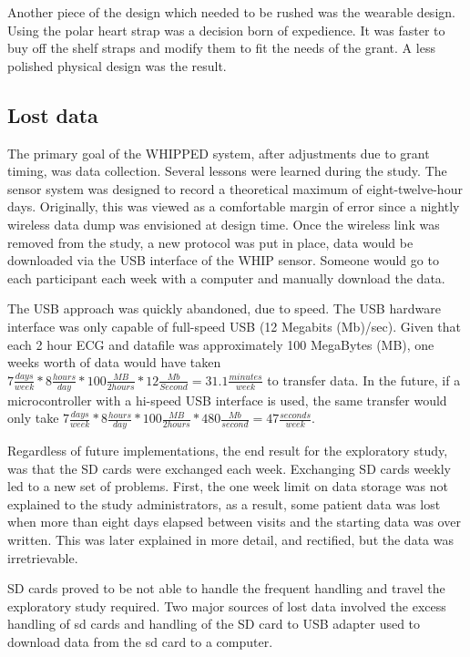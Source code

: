 Another piece of the design which needed to be rushed was the wearable design. Using the polar heart strap was a decision born of expedience. It was faster to buy off the shelf straps and modify them to fit the needs of the grant. A less polished physical design was the result.

\subsection {Lost data}
The primary goal of the WHIPPED system, after adjustments due to grant timing, was data collection. Several lessons were learned during the study. The sensor system was designed to record a theoretical maximum of eight-twelve-hour days. Originally, this was viewed as a comfortable margin of error since a nightly wireless data dump was envisioned at design time. Once the wireless link was removed from the study, a new protocol was put in place, data would be downloaded via the USB interface of the WHIP sensor. Someone would go to each participant each week with a computer and manually download the data.

The USB approach was quickly abandoned, due to speed. The USB hardware interface was only capable of full-speed USB (12 Megabits (Mb)/sec). Given that each 2 hour ECG and  datafile was approximately 100 MegaBytes (MB), one weeks worth of data would have taken $ 7 \frac{days}{week} * 8 \frac{hours}{day} * 100 \frac{MB}{2 hours} * 12 \frac{Mb}{Second} = 31.1 \frac{minutes}{week}$ to transfer data. In the future, if a microcontroller with a hi-speed USB interface is used, the same transfer would only take $ 7 \frac{days}{week} * 8 \frac{hours}{day} * 100 \frac{MB}{2 hours} * 480 \frac{Mb}{second} = 47 \frac{seconds}{week}$.  

Regardless of future implementations, the end result for the exploratory study, was that the SD cards were exchanged each week. 
Exchanging SD cards weekly led to a new set of problems. First, the one week limit on data storage was not explained to the study administrators, as a result, some patient data was lost when more than eight days elapsed between visits and the starting data was over written. This was later explained in more detail, and rectified, but the data was irretrievable. 

SD cards proved to be not able to handle the frequent handling and travel the exploratory study required. Two major sources of lost data involved the excess handling of sd cards and handling of the SD card to USB adapter used to download data from the sd card to a computer.

